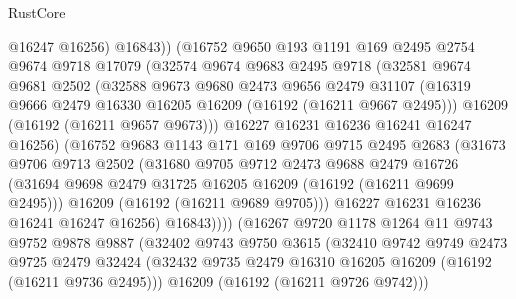 \begin{lexlean}{RustCore}
\begin{coremodule}
                    @16247
                    @16256)
                  @16843))
              (@16752
                @9650
                @193
                @1191
                @169
                @2495
                @2754
                @9674
                @9718
                @17079
                (@32574
                  @9674
                  @9683
                  @2495
                  @9718
                  (@32581
                    @9674
                    @9681
                    @2502
                    (@32588
                      @9673
                      @9680
                      @2473
                      @9656
                      @2479
                      @31107
                      (@16319 @9666 @2479 @16330 @16205 @16209 (@16192 (@16211 @9667 @2495)))
                      @16209
                      (@16192 (@16211 @9657 @9673)))
                    @16227
                    @16231
                    @16236
                    @16241
                    @16247
                    @16256)
                  (@16752
                    @9683
                    @1143
                    @171
                    @169
                    @9706
                    @9715
                    @2495
                    @2683
                    (@31673
                      @9706
                      @9713
                      @2502
                      (@31680
                        @9705
                        @9712
                        @2473
                        @9688
                        @2479
                        @16726
                        (@31694 @9698 @2479 @31725 @16205 @16209 (@16192 (@16211 @9699 @2495)))
                        @16209
                        (@16192 (@16211 @9689 @9705)))
                      @16227
                      @16231
                      @16236
                      @16241
                      @16247
                      @16256)
                    @16843))))
            (@16267
              @9720
              @1178
              @1264
              @11
              @9743
              @9752
              @9878
              @9887
              (@32402
                @9743
                @9750
                @3615
                (@32410
                  @9742
                  @9749
                  @2473
                  @9725
                  @2479
                  @32424
                  (@32432 @9735 @2479 @16310 @16205 @16209 (@16192 (@16211 @9736 @2495)))
                  @16209
                  (@16192 (@16211 @9726 @9742)))

\end{coremodule}
\end{lexlean}
